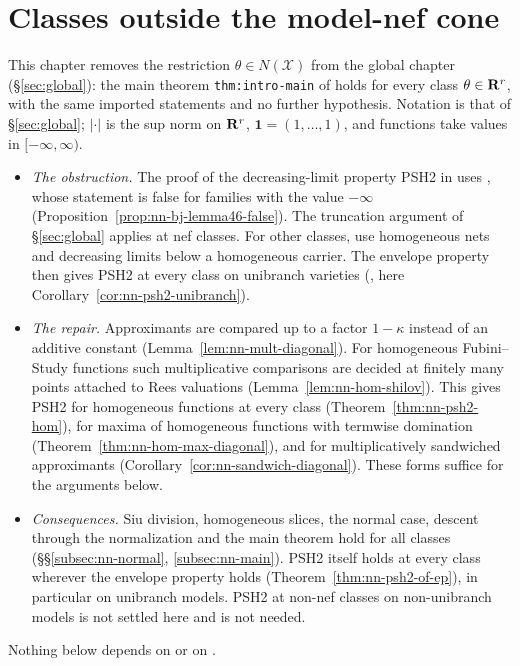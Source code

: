 \section{Classes outside the model-nef cone}\label{sec:nonnef}

This chapter removes the restriction $\theta\in N(\mathcal X)$ from the global chapter (\S\ref{sec:global}): the main theorem
\texttt{thm:intro-main} of \cite{FHX} holds for every class $\theta\in\mathbf{R}^r$, with the same imported statements and no further
hypothesis. Notation is that of \S\ref{sec:global}; $|\cdot|$ is the sup norm on $\mathbf{R}^r$, $\mathbf 1=(1,\dots,1)$, and functions take
values in $[-\infty,\infty)$.

\begin{itemize}
\item \emph{The obstruction.} The proof of the decreasing-limit property PSH2 in
\cite[Theorem~4.5]{BJ22} uses \cite[Lemma~4.6]{BJ22}, whose statement is false for families
with the value $-\infty$ (Proposition~\ref{prop:nn-bj-lemma46-false}). The truncation argument
of \S\ref{sec:global} applies at nef classes. For other classes, \cite[Proposition~2.1(1),
Remark~2.2, Lemmas~2.3 and~7.4]{FHX} use homogeneous nets and decreasing limits below a
homogeneous carrier. The envelope property then gives PSH2 at every class on unibranch
varieties (\cite[Corollary~8.4]{FHX}, here Corollary~\ref{cor:nn-psh2-unibranch}).
\item \emph{The repair.} Approximants are compared up to a factor $1-\kappa$ instead of an additive constant
(Lemma~\ref{lem:nn-mult-diagonal}). For homogeneous Fubini--Study functions such multiplicative comparisons are decided at finitely
many points attached to Rees valuations (Lemma~\ref{lem:nn-hom-shilov}). This gives PSH2 for homogeneous functions at every class
(Theorem~\ref{thm:nn-psh2-hom}), for maxima of homogeneous functions with termwise domination (Theorem~\ref{thm:nn-hom-max-diagonal}),
and for multiplicatively sandwiched approximants (Corollary~\ref{cor:nn-sandwich-diagonal}). These forms suffice for the arguments below.
\item \emph{Consequences.} Siu division, homogeneous slices, the normal case, descent through the normalization and the main
theorem hold for all classes (\S\S\ref{subsec:nn-normal}, \ref{subsec:nn-main}). PSH2 itself holds at every class wherever the
envelope property holds (Theorem~\ref{thm:nn-psh2-of-ep}), in particular on unibranch models. PSH2 at non-nef classes on
non-unibranch models is not settled here and is not needed.
\end{itemize}
Nothing below depends on \cite[Theorem~6.21]{BJ22} or on \cite[Lemma~4.6]{BJ22}.

